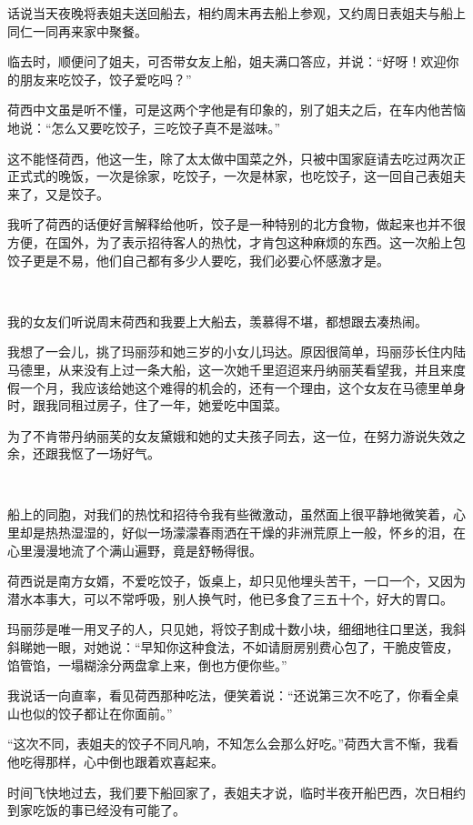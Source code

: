 \par 话说当天夜晚将表姐夫送回船去，相约周末再去船上参观，又约周日表姐夫与船上同仁一同再来家中聚餐。
\par 临去时，顺便问了姐夫，可否带女友上船，姐夫满口答应，并说：“好呀！欢迎你的朋友来吃饺子，饺子爱吃吗？”
\par 荷西中文虽是听不懂，可是这两个字他是有印象的，别了姐夫之后，在车内他苦恼地说：“怎么又要吃饺子，三吃饺子真不是滋味。”
\par 这不能怪荷西，他这一生，除了太太做中国菜之外，只被中国家庭请去吃过两次正正式式的晚饭，一次是徐家，吃饺子，一次是林家，也吃饺子，这一回自己表姐夫来了，又是饺子。
\par 我听了荷西的话便好言解释给他听，饺子是一种特别的北方食物，做起来也并不很方便，在国外，为了表示招待客人的热忱，才肯包这种麻烦的东西。这一次船上包饺子更是不易，他们自己都有多少人要吃，我们必要心怀感激才是。
\par  
\par 我的女友们听说周末荷西和我要上大船去，羡慕得不堪，都想跟去凑热闹。
\par 我想了一会儿，挑了玛丽莎和她三岁的小女儿玛达。原因很简单，玛丽莎长住内陆马德里，从来没有上过一条大船，这一次她千里迢迢来丹纳丽芙看望我，并且来度假一个月，我应该给她这个难得的机会的，还有一个理由，这个女友在马德里单身时，跟我同租过房子，住了一年，她爱吃中国菜。
\par 为了不肯带丹纳丽芙的女友黛娥和她的丈夫孩子同去，这一位，在努力游说失效之余，还跟我怄了一场好气。
\par  
\par 船上的同胞，对我们的热忱和招待令我有些微激动，虽然面上很平静地微笑着，心里却是热热湿湿的，好似一场濛濛春雨洒在干燥的非洲荒原上一般，怀乡的泪，在心里漫漫地流了个满山遍野，竟是舒畅得很。
\par 荷西说是南方女婿，不爱吃饺子，饭桌上，却只见他埋头苦干，一口一个，又因为潜水本事大，可以不常呼吸，别人换气时，他已多食了三五十个，好大的胃口。
\par 玛丽莎是唯一用叉子的人，只见她，将饺子割成十数小块，细细地往口里送，我斜斜睇她一眼，对她说：“早知你这种食法，不如请厨房别费心包了，干脆皮管皮，馅管馅，一塌糊涂分两盘拿上来，倒也方便你些。”
\par 我说话一向直率，看见荷西那种吃法，便笑着说：“还说第三次不吃了，你看全桌山也似的饺子都让在你面前。”
\par “这次不同，表姐夫的饺子不同凡响，不知怎么会那么好吃。”荷西大言不惭，我看他吃得那样，心中倒也跟着欢喜起来。
\par 时间飞快地过去，我们要下船回家了，表姐夫才说，临时半夜开船巴西，次日相约到家吃饭的事已经没有可能了。
